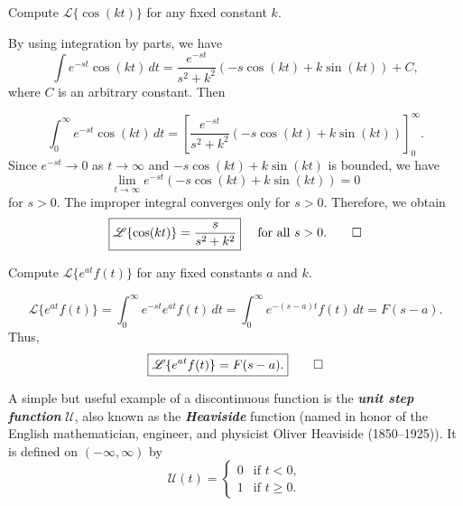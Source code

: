 \begin{example}
	Compute $\mathscr{L}\{\cos(kt)\}$ for any fixed constant $k.$
\end{example}
\begin{solution}
	By using integration by parts,  we have 
	\[
\int e^{-st} \cos(kt) \, dt = \frac{e^{-st}}{s^2 + k^2} \left( -s \cos(kt) + k \sin(kt) \right) + C,
	\]
	where $C$ is an arbitrary constant.
	Then 
	
	\[
	\int_0^\infty e^{-st} \cos(kt) \, dt =\left[\frac{e^{-st}}{s^2 + k^2}\left(-s \cos(kt) + k \sin(kt)\right) \right]_0^\infty.
	\]
	Since $e^{-st} \to 0$  as $t\to\infty$ and $-s \cos(kt) + k \sin(kt)$ is bounded, we have
	\[
	\lim_{t \to \infty} e^{-st}\left( -s \cos(kt) + k \sin(kt) \right)  = 0\] for $s>0.$ The improper integral converges only for $s>0.$ 
	Therefore, 
	we obtain
	\[
	\boxed{\mathscr{L}\{\cos(kt)\} = \frac{s}{s^2 + k^2}} \quad \text{ for all } s>0.\qedhere
	\]
\end{solution}

\begin{example}\label{shiting-on-s-axis}
	Compute $\mathscr{L}\{e^{at}f(t)\}$ for any fixed constants $a$ and $k.$
\end{example}
\begin{solution}
	\[
	\mathscr{L}\{e^{at}f(t)\} = \int_0^\infty e^{-st} e^{at}f(t)\, dt=\int_0^\infty e^{-(s-a)t} f(t)\, dt= F(s-a).\]
	 Thus,
	 \[
	 \boxed{\mathscr{L}\{e^{at}f(t)\} = F(s-a).}\qedhere
	 \]
\end{solution}


A simple but useful example of a discontinuous function is
the \textbf{\textit{unit step function}} $\mathcal{U}$, also  known as the \textbf{\textit{Heaviside}} function (named in honor of the English mathematician, engineer, and physicist Oliver Heaviside (1850--1925)). It is defined on $(-\infty, \infty)$ by
\[
\mathcal{U}(t) =
\begin{cases}
	0 & \text{if } t < 0, \\
	1 & \text{if } t \ge 0.
\end{cases}
\]

